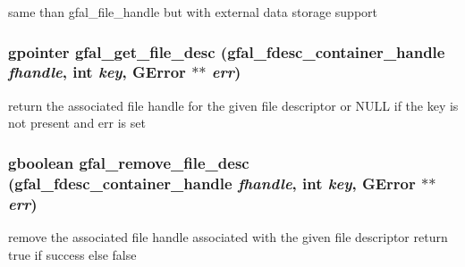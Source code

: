 same than gfal\_\-file\_\-handle but with external data storage support 
\subsubsection{\setlength{\rightskip}{0pt plus 5cm}gpointer gfal\_\-get\_\-file\_\-desc (gfal\_\-fdesc\_\-container\_\-handle {\em fhandle}, int {\em key}, GError $\ast$$\ast$ {\em err})}\label{gfal__common__filedescriptor_8h_91568ee8206643b36d685269b012eb45}


return the associated file handle for the given file descriptor or NULL if the key is not present and err is set 
\subsubsection{\setlength{\rightskip}{0pt plus 5cm}gboolean gfal\_\-remove\_\-file\_\-desc (gfal\_\-fdesc\_\-container\_\-handle {\em fhandle}, int {\em key}, GError $\ast$$\ast$ {\em err})}\label{gfal__common__filedescriptor_8h_4b10e1d3a5ffde849302fffdba207835}


remove the associated file handle associated with the given file descriptor return true if success else false 